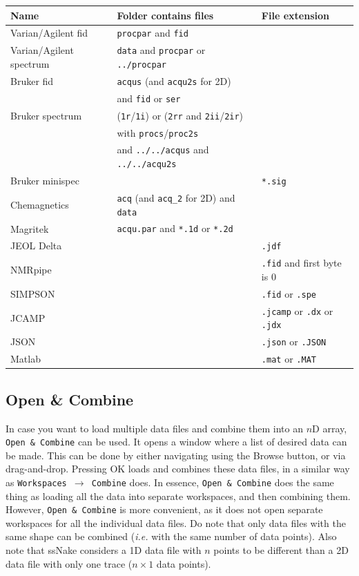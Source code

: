 \documentclass[11pt,a4paper]{article}
\begin{document}
\begin{center}
\begin{tabular}{lll}
\toprule
Name & Folder contains files & File extension\\
\midrule
\rowcolor{gray!30!white}
Varian/Agilent fid &  \texttt{procpar} and \texttt{fid} & \\
Varian/Agilent spectrum&  \texttt{data} and \texttt{procpar} or \texttt{../procpar} & \\
\rowcolor{gray!30!white}
Bruker fid &  \texttt{acqus} (and \texttt{acqu2s} for 2D)  &\\
\rowcolor{gray!30!white}
&and \texttt{fid} or \texttt{ser}&\\
Bruker spectrum & (\texttt{1r}/\texttt{1i}) or (\texttt{2rr} and \texttt{2ii}/\texttt{2ir}) &\\
  & with \texttt{procs}/\texttt{proc2s}  &\\
 &and \texttt{../../acqus} and \texttt{../../acqu2s} & \\
\rowcolor{gray!30!white}
Bruker minispec &  & \texttt{*.sig} \\
Chemagnetics &  \texttt{acq} (and \texttt{acq\_2} for 2D) and \texttt{data} &\\
\rowcolor{gray!30!white}
Magritek &  \texttt{acqu.par} and \texttt{*.1d} or \texttt{*.2d}&\\
JEOL Delta & & \texttt{.jdf}\\
\rowcolor{gray!30!white}
NMRpipe & & \texttt{.fid} and first byte is 0\\
SIMPSON &  & \texttt{.fid} or \texttt{.spe} \\
\rowcolor{gray!30!white}
JCAMP & & \texttt{.jcamp} or \texttt{.dx} or \texttt{.jdx}\\
JSON & & \texttt{.json} or \texttt{.JSON}\\
\rowcolor{gray!30!white}
Matlab & & \texttt{.mat} or \texttt{.MAT}\\
\bottomrule
\end{tabular}
\end{center}


\subsection{Open \& Combine}
In case you want to load multiple data files and combine them into an $n$D array, \texttt{Open~\&~Combine} can be used. It opens a window where a list of desired data can be made. This can be done by either navigating using the Browse button, or via drag-and-drop. Pressing OK loads and combines these data files, in a similar way as \texttt{Workspaces~$\rightarrow$~Combine} does. In essence, \texttt{Open~\&~Combine} does the same thing as loading all the data into separate workspaces, and then combining them. However, \texttt{Open~\&~Combine} is more convenient, as it does not open separate workspaces for all the individual data files. Do note that only data files with the same shape can be combined (\textit{i.e.} with the same number of data points). Also note that ssNake considers a 1D data file with $n$ points to be different than a 2D data file with only one trace ($n\times1$ data points).
\end{document}
